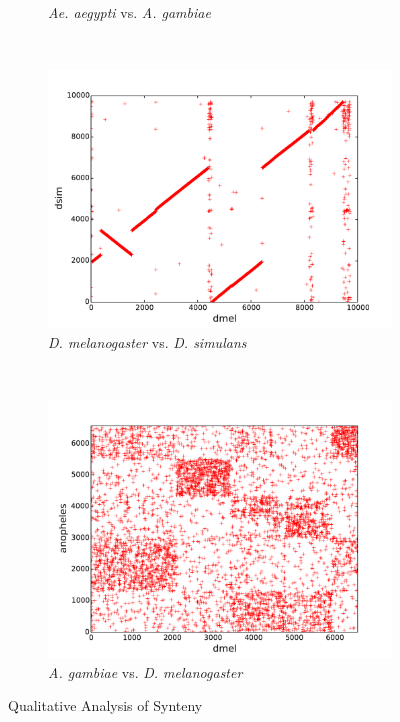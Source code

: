 \begin{figure}[H]
\begin{subfigure}[b]{0.45\textwidth}
    \caption{\emph{Ae. aegypti} vs. \emph{A. gambiae}}
    \label{fig:synteny-dotplots-mosquitoes}
  \end{subfigure}
  ~
  \begin{subfigure}[b]{0.45\textwidth}
    \includegraphics[width=\textwidth]{figures/synteny/dmel_dsim_plot}
    \caption{\emph{D. melanogaster} vs. \emph{D. simulans}}
    \label{fig:synteny-dotplots-drosophila}
  \end{subfigure}
  ~
  \begin{subfigure}[b]{0.45\textwidth}
    \includegraphics[width=\textwidth]{figures/synteny/dmel_anopheles_plot}
    \caption{\emph{A. gambiae} vs. \emph{D. melanogaster}}
    \label{fig:synteny-dotplots-anopheles-drosophila}
  \end{subfigure}
\label{fig:dot-plots}
\caption{Qualitative Analysis of Synteny}
\end{figure}

